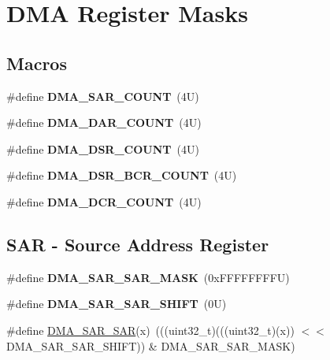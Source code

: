 \hypertarget{group___d_m_a___register___masks}{}\section{D\+MA Register Masks}
\label{group___d_m_a___register___masks}
\subsection*{Macros}
\begin{DoxyCompactItemize}
\item 
\mbox{\label{group___d_m_a___register___masks_gabc06993280d6aa648616aab30d60f98c}} 
\#define {\bfseries D\+M\+A\+\_\+\+S\+A\+R\+\_\+\+C\+O\+U\+NT}~(4\+U)
\item 
\mbox{\label{group___d_m_a___register___masks_ga3609c6bba6a46aa22a3d96a2bc24338a}} 
\#define {\bfseries D\+M\+A\+\_\+\+D\+A\+R\+\_\+\+C\+O\+U\+NT}~(4\+U)
\item 
\mbox{\label{group___d_m_a___register___masks_ga3897ed1e783e35016fe929f0daec2c06}} 
\#define {\bfseries D\+M\+A\+\_\+\+D\+S\+R\+\_\+\+C\+O\+U\+NT}~(4\+U)
\item 
\mbox{\label{group___d_m_a___register___masks_ga53e0ebd6a3892d90b1771598edec2799}} 
\#define {\bfseries D\+M\+A\+\_\+\+D\+S\+R\+\_\+\+B\+C\+R\+\_\+\+C\+O\+U\+NT}~(4\+U)
\item 
\mbox{\label{group___d_m_a___register___masks_ga14084a16e05484453842dac03dec13fd}} 
\#define {\bfseries D\+M\+A\+\_\+\+D\+C\+R\+\_\+\+C\+O\+U\+NT}~(4\+U)
\end{DoxyCompactItemize}
\subsection*{S\+AR -\/ Source Address Register}
\begin{DoxyCompactItemize}
\item 
\mbox{\label{group___d_m_a___register___masks_ga990e3ca99cc1d75f5942432959953048}} 
\#define {\bfseries D\+M\+A\+\_\+\+S\+A\+R\+\_\+\+S\+A\+R\+\_\+\+M\+A\+SK}~(0x\+F\+F\+F\+F\+F\+F\+F\+F\+U)
\item 
\mbox{\label{group___d_m_a___register___masks_ga869308e6de564860ede4d607b19bce31}} 
\#define {\bfseries D\+M\+A\+\_\+\+S\+A\+R\+\_\+\+S\+A\+R\+\_\+\+S\+H\+I\+FT}~(0\+U)
\item 
\#define \mbox{\hyperlink{group___d_m_a___register___masks_ga68e0d9de2ef332cbd1a302d177a29848}{D\+M\+A\+\_\+\+S\+A\+R\+\_\+\+S\+AR}}(x)~(((uint32\+\_\+t)(((uint32\+\_\+t)(x)) $<$$<$ D\+M\+A\+\_\+\+S\+A\+R\+\_\+\+S\+A\+R\+\_\+\+S\+H\+I\+FT)) \& D\+M\+A\+\_\+\+S\+A\+R\+\_\+\+S\+A\+R\+\_\+\+M\+A\+SK)
\end{DoxyCompactItemize}
